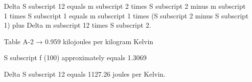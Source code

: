 Delta S subscript 12 equals m subscript 2 times S subscript 2 minus m subscript 1 times S subscript 1 equals m subscript 1 times (S subscript 2 minus S subscript 1) plus Delta m subscript 12 times S subscript 2.  

Table A-2 → 0.959 kilojoules per kilogram Kelvin  

S subscript f (100) approximately equals 1.3069  

Delta S subscript 12 equals 1127.26 joules per Kelvin.